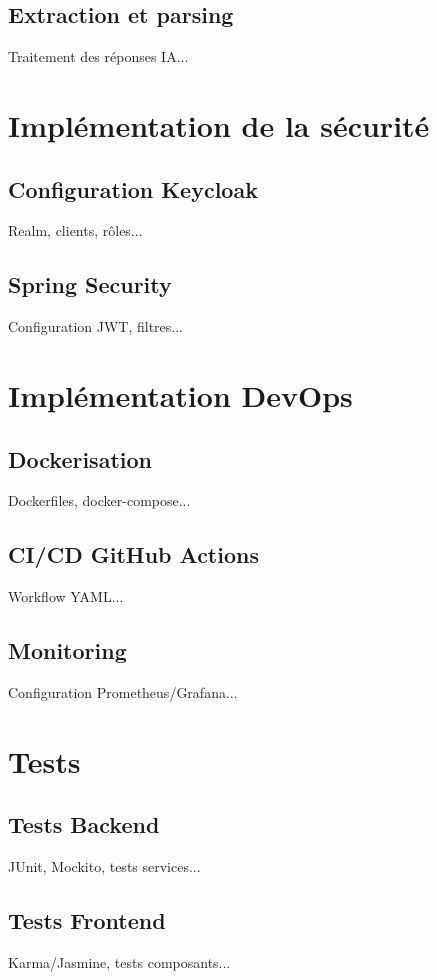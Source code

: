 \documentclass[12pt,a4paper]{report}
\begin{document}
\subsection{Extraction et parsing}
Traitement des réponses IA...

\section{Implémentation de la sécurité}
\subsection{Configuration Keycloak}
Realm, clients, rôles...

\subsection{Spring Security}
Configuration JWT, filtres...

\section{Implémentation DevOps}
\subsection{Dockerisation}
Dockerfiles, docker-compose...

\subsection{CI/CD GitHub Actions}
Workflow YAML...

\subsection{Monitoring}
Configuration Prometheus/Grafana...

\section{Tests}
\subsection{Tests Backend}
JUnit, Mockito, tests services...

\subsection{Tests Frontend}
Karma/Jasmine, tests composants...
\end{document}
